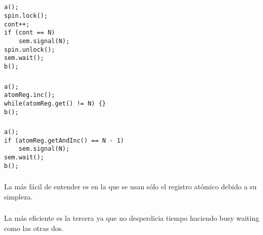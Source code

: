 \subsection{}

\subsubsection{}

\begin{codesnippet}
\begin{verbatim}
a();
spin.lock();
cont++;
if (cont == N)
    sem.signal(N);
spin.unlock();
sem.wait();
b();
\end{verbatim}
\end{codesnippet}

\subsubsection{}

\begin{codesnippet}
\begin{verbatim}
a();
atomReg.inc();
while(atomReg.get() != N) {}
b();
\end{verbatim}
\end{codesnippet}

\subsubsection{}

\begin{codesnippet}
\begin{verbatim}
a();
if (atomReg.getAndInc() == N - 1)
    sem.signal(N);
sem.wait();
b();
\end{verbatim}
\end{codesnippet}

\subsubsection{}

La más fácil de entender es en la que se usan sólo el registro atómico debido
a su simpleza.

\subsubsection{}

La más eficiente es la tercera ya que no desperdicia tiempo haciendo busy
waiting como las otras dos.

